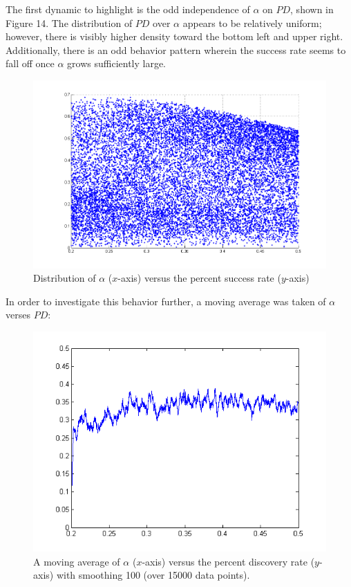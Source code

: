\documentclass[a4paper]{article}
\begin{document}
The first dynamic to highlight is the odd independence of $\alpha$ on $PD$, shown in Figure 14. The distribution of $PD$ over $\alpha$ appears to be relatively uniform; however, there is visibly higher density toward the bottom left and upper right. Additionally, there is an odd behavior pattern wherein the success rate seems to fall off once $\alpha$ grows sufficiently large. 

\begin{figure}[H]\begin{center}
\includegraphics[scale=0.3]{../Matlab/Images/PctSuccessByAlpha.png}
\caption{Distribution of $\alpha$ ($x$-axis) versus the percent success rate ($y$-axis)}
\end{center}\end{figure}

In order to investigate this behavior further, a moving average was taken of $\alpha$ verses $PD$:

\begin{figure}[H]\begin{center}
\includegraphics[scale=.5]{../Matlab/Images/MovAvgAlphaPctSuccess.png}
\caption{A moving average of $\alpha$ ($x$-axis) versus the percent discovery rate ($y$-axis) with smoothing 100 (over 15000 data points).}
\end{center}\end{figure}
\end{document}
